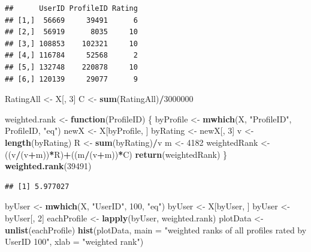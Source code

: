 \documentclass[
]{article}
\newenvironment{Shaded}{\begin{snugshade}}{\end{snugshade}}
\newcommand{\ControlFlowTok}[1]{\textcolor[rgb]{0.13,0.29,0.53}{\textbf{#1}}}
\newcommand{\DataTypeTok}[1]{\textcolor[rgb]{0.13,0.29,0.53}{#1}}
\newcommand{\DecValTok}[1]{\textcolor[rgb]{0.00,0.00,0.81}{#1}}
\newcommand{\KeywordTok}[1]{\textcolor[rgb]{0.13,0.29,0.53}{\textbf{#1}}}
\newcommand{\NormalTok}[1]{#1}
\newcommand{\OperatorTok}[1]{\textcolor[rgb]{0.81,0.36,0.00}{\textbf{#1}}}
\newcommand{\StringTok}[1]{\textcolor[rgb]{0.31,0.60,0.02}{#1}}
\begin{document}
\begin{verbatim}
##      UserID ProfileID Rating
## [1,]  56669     39491      6
## [2,]  56919      8035     10
## [3,] 108853    102321     10
## [4,] 116784     52568      2
## [5,] 132748    220878     10
## [6,] 120139     29077      9
\end{verbatim}

\begin{Shaded}
\begin{Highlighting}[]
\NormalTok{  RatingAll <-}\StringTok{ }\NormalTok{X[, }\DecValTok{3}\NormalTok{]}
\NormalTok{  C <-}\StringTok{ }\KeywordTok{sum}\NormalTok{(RatingAll)}\OperatorTok{/}\DecValTok{3000000}
\end{Highlighting}
\end{Shaded}

\begin{Shaded}
\begin{Highlighting}[]
\NormalTok{weighted.rank <-}\StringTok{ }\ControlFlowTok{function}\NormalTok{(ProfileID) \{}
\NormalTok{  byProfile <-}\StringTok{ }\KeywordTok{mwhich}\NormalTok{(X, }\StringTok{"ProfileID"}\NormalTok{, ProfileID, }\StringTok{"eq"}\NormalTok{)}
\NormalTok{  newX <-}\StringTok{ }\NormalTok{X[byProfile, ]}
\NormalTok{  byRating <-}\StringTok{ }\NormalTok{newX[, }\DecValTok{3}\NormalTok{]}
\NormalTok{  v <-}\StringTok{ }\KeywordTok{length}\NormalTok{(byRating)}
\NormalTok{  R <-}\StringTok{ }\KeywordTok{sum}\NormalTok{(byRating)}\OperatorTok{/}\NormalTok{v}
\NormalTok{  m <-}\StringTok{ }\DecValTok{4182}
\NormalTok{  weightedRank <-}\StringTok{ }\NormalTok{((v}\OperatorTok{/}\NormalTok{(v}\OperatorTok{+}\NormalTok{m))}\OperatorTok{*}\NormalTok{R)}\OperatorTok{+}\NormalTok{((m}\OperatorTok{/}\NormalTok{(v}\OperatorTok{+}\NormalTok{m))}\OperatorTok{*}\NormalTok{C)}
  \KeywordTok{return}\NormalTok{(weightedRank)}
\NormalTok{\}}
\KeywordTok{weighted.rank}\NormalTok{(}\DecValTok{39491}\NormalTok{)}
\end{Highlighting}
\end{Shaded}

\begin{verbatim}
## [1] 5.977027
\end{verbatim}

\begin{Shaded}
\begin{Highlighting}[]
\NormalTok{byUser <-}\StringTok{ }\KeywordTok{mwhich}\NormalTok{(X, }\StringTok{"UserID"}\NormalTok{, }\DecValTok{100}\NormalTok{, }\StringTok{"eq"}\NormalTok{)}
\NormalTok{byUser <-}\StringTok{ }\NormalTok{X[byUser, ]}
\NormalTok{byUser <-}\StringTok{ }\NormalTok{byUser[, }\DecValTok{2}\NormalTok{]}
\NormalTok{eachProfile <-}\StringTok{ }\KeywordTok{lapply}\NormalTok{(byUser, weighted.rank)}
\NormalTok{plotData <-}\StringTok{ }\KeywordTok{unlist}\NormalTok{(eachProfile)}
\KeywordTok{hist}\NormalTok{(plotData, }\DataTypeTok{main =} \StringTok{"weighted ranks of all profiles rated by UserID 100"}\NormalTok{, }\DataTypeTok{xlab =} \StringTok{"weighted rank"}\NormalTok{)}
\end{Highlighting}
\end{Shaded}
\end{document}
